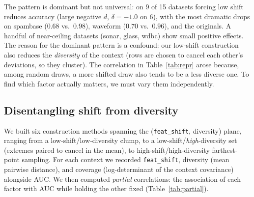 \documentclass[11pt,a4paper]{article}
\begin{document}
The pattern is dominant but not universal: on 9 of 15 datasets forcing low shift
reduces accuracy (large negative $d$, $\delta=-1.0$ on 6), with the most dramatic
drops on spambase ($0.68$ vs.\ $0.98$), waveform ($0.70$ vs.\ $0.96$), and the
originals. A handful of near-ceiling datasets (sonar, glass, wdbc) show small
positive effects. The reason for the dominant pattern is a confound: our low-shift
construction also reduces the \emph{diversity} of the context (rows are chosen to
cancel each other's deviations, so they cluster). The correlation in
Table~\ref{tab:repr} arose because, among random draws, a more shifted draw also
tends to be a less diverse one. To find which factor actually matters, we must
vary them independently.

\subsection{Disentangling shift from diversity}

We built six construction methods spanning the (\texttt{feat\_shift},
diversity) plane, ranging from a low-shift/low-diversity clump, to a
low-shift/\emph{high}-diversity set (extremes paired to cancel in the mean), to
high-shift/high-diversity farthest-point sampling. For each context we recorded
\texttt{feat\_shift}, diversity (mean pairwise distance), and coverage
(log-determinant of the context covariance) alongside AUC. We then computed \emph{partial} correlations: the
association of each factor with AUC while holding the other fixed
(Table~\ref{tab:partial}).
\end{document}
